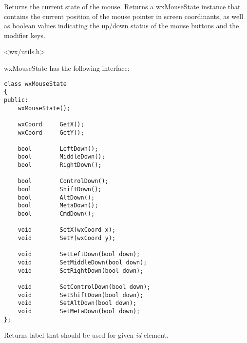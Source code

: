 \label{wxgetmousestate}


Returns the current state of the mouse.  Returns a wxMouseState
instance that contains the current position of the mouse pointer in
screen coordinants, as well as boolean values indicating the up/down
status of the mouse buttons and the modifier keys.


<wx/utils.h>

wxMouseState has the following interface:

\begin{verbatim}
class wxMouseState
{
public:
    wxMouseState();

    wxCoord     GetX();
    wxCoord     GetY();

    bool        LeftDown();
    bool        MiddleDown();
    bool        RightDown();

    bool        ControlDown();
    bool        ShiftDown();
    bool        AltDown();
    bool        MetaDown();
    bool        CmdDown();

    void        SetX(wxCoord x);
    void        SetY(wxCoord y);

    void        SetLeftDown(bool down);
    void        SetMiddleDown(bool down);
    void        SetRightDown(bool down);

    void        SetControlDown(bool down);
    void        SetShiftDown(bool down);
    void        SetAltDown(bool down);
    void        SetMetaDown(bool down);
};
\end{verbatim}



\label{wxgetstocklabel}


Returns label that should be used for given {\it id} element.




